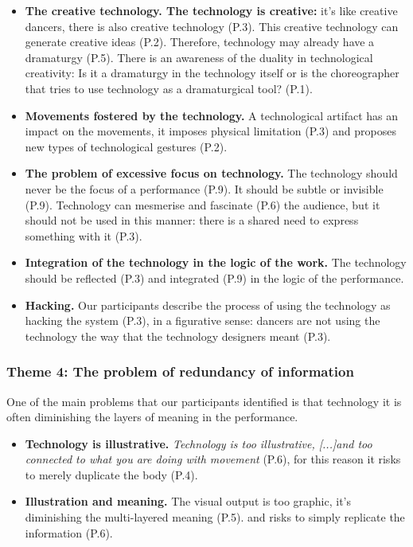 \begin{itemize}
\item \textbf{The creative technology. The technology is creative: }it’s like creative dancers, there is also creative technology (P.3). This creative technology can generate creative ideas (P.2). Therefore, technology may already have a dramaturgy (P.5). There is an awareness of the duality in technological creativity: Is it a dramaturgy in the technology itself or is the choreographer that tries to use technology as a dramaturgical tool? (P.1).
\item \textbf{Movements fostered by the technology. }A technological artifact has an impact on the movements, it imposes physical limitation (P.3) and proposes new types of technological gestures (P.2).
\item \textbf{The problem of excessive focus on technology. }The technology should never be the focus of a performance (P.9). It should be subtle or invisible (P.9). Technology can mesmerise and fascinate (P.6) the audience, but it should not be used in this manner: there is a shared need to express something with it (P.3).
\item \textbf{Integration of the technology in the logic of the work.} The technology should be reflected (P.3) and integrated (P.9) in the logic of the performance.
\item \textbf{Hacking. } Our participants describe the process of using the technology as hacking the system (P.3), in a figurative sense: dancers are not using the technology the way that the technology designers meant (P.3).
\end{itemize}

\subsubsection{Theme 4: The problem of redundancy of information} 

One of the main problems that our participants identified is that technology it is often diminishing the layers of meaning in the performance.

\begin{itemize}
\item \textbf{Technology is illustrative.} \textit{Technology is too illustrative, [...]and too connected to what you are doing with movement} (P.6), for this reason it risks to merely duplicate the body (P.4).
\item \textbf{Illustration and meaning.} The visual output is too graphic, it’s diminishing the multi-layered meaning (P.5). and risks to simply replicate the information (P.6).
\end{itemize}

